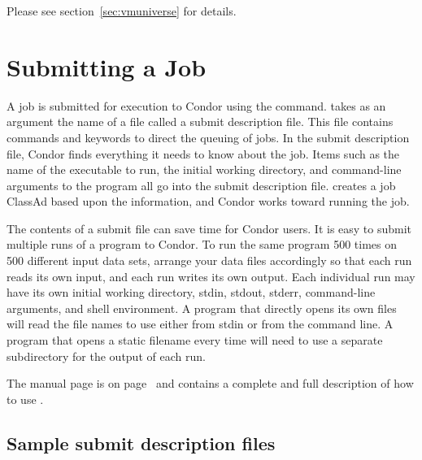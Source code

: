 Please see section~\ref{sec:vmuniverse} for details.


\section{Submitting a Job}

A job is submitted for execution to Condor using the
 command.
 takes as an argument the name of a
file called a submit description file.
This file contains commands and keywords to direct the queuing of jobs.
In the submit description file, Condor finds everything it needs
to know about the job.  Items such as the name of the executable to run,
the initial working directory, and command-line arguments to the
program all go into
the submit description file.   creates a job
ClassAd based upon the information,
and Condor
works toward running the job.

The contents of a submit file
can save time for Condor users.
It is easy to submit multiple runs of a program to
Condor. To run the same program 500 times on 500
different input data sets, arrange your data files
accordingly so that each run reads its own input, and each run
writes its own output.
Each individual run may have its own initial
working directory, stdin, stdout, stderr, command-line arguments, and
shell environment.
A program that directly opens its own
files will read the file names to use either from stdin
or from the command line. 
A program that opens a static filename every time
will need to use a separate subdirectory for the output of each run.

The  manual page 
is on page~\pageref{man-condor-submit} and
contains a complete and full description of how to use .



\subsection{\label{sec:sample-submit-files}Sample submit description files}  

